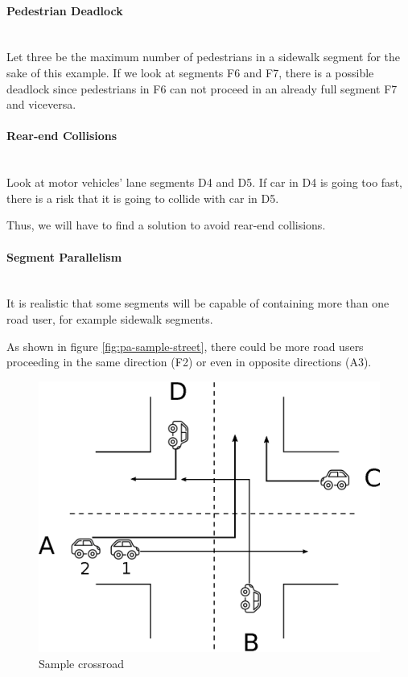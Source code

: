 \paragraph{Pedestrian Deadlock} \mbox{} \\

Let three be the maximum number of pedestrians in a sidewalk segment for the
sake of this example.
If we look at segments F6 and F7, there is a possible deadlock since
pedestrians in F6 can not proceed in an already full segment F7 and viceversa.

\paragraph{Rear-end Collisions} \mbox{} \\

Look at motor vehicles' lane segments D4 and D5. If car in D4 is going too
fast, there is a risk that it is going to collide with car in D5.

Thus, we will have to find a solution to avoid rear-end collisions.

\paragraph{Segment Parallelism} \mbox{} \\

It is realistic that some segments will be capable of containing more than one
road user, for example sidewalk segments.

As shown in figure \ref{fig:pa-sample-street}, there could be more road users
proceeding in the same direction (F2) or even in opposite directions (A3).

\begin{figure}[H]
  \centering
  \includegraphics[width=.6\columnwidth]{images/analysis/crossroads.eps}
  \caption{Sample crossroad}
  \label{fig:pa-sample-crossroad}
\end{figure}

